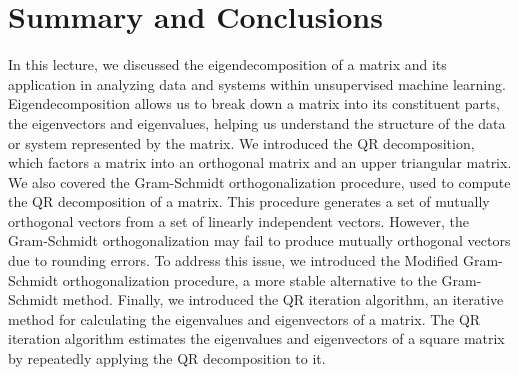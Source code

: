 \documentclass{article}[11pt]
\begin{document}
\section{Summary and Conclusions}
In this lecture, we discussed the eigendecomposition of a matrix and its application in analyzing data and systems within unsupervised machine learning. Eigendecomposition allows us to break down a matrix into its constituent parts, the eigenvectors and eigenvalues, helping us understand the structure of the data or system represented by the matrix. We introduced the QR decomposition, which factors a matrix into an orthogonal matrix and an upper triangular matrix. We also covered the Gram-Schmidt orthogonalization procedure, used to compute the QR decomposition of a matrix. This procedure generates a set of mutually orthogonal vectors from a set of linearly independent vectors. However, the Gram-Schmidt orthogonalization may fail to produce mutually orthogonal vectors due to rounding errors. To address this issue, we introduced the Modified Gram-Schmidt orthogonalization procedure, a more stable alternative to the Gram-Schmidt method. Finally, we introduced the QR iteration algorithm, an iterative method for calculating the eigenvalues and eigenvectors of a matrix. The QR iteration algorithm estimates the eigenvalues and eigenvectors of a square matrix by repeatedly applying the QR decomposition to it.


\end{document}
